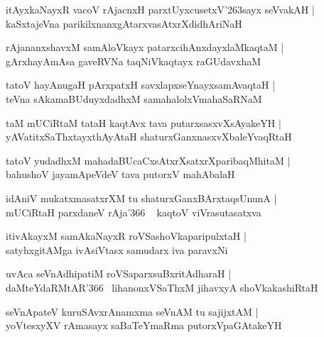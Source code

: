 \documentclass[twoside,12pt,openright]{book}
\def\S{\char'263}
\newcounter{shloka}[chapter]
\begin{document}
\begin{shloka}%
itAyxkaNayxR vacoV rAjacnxH parxtUyxcusetxV\S sayx seVvakAH |\\
kaSxtajeVna parikilxnanxgAtarxvasAtxrXdidhAriNaH 
\end{shloka}

\begin{shloka}%
rAjananxshavxM samAloVkayx patarxcihAnxdayxlaMkaqtaM |\\
gArxhayAmAsa gaveRVNa taqNiVkaqtayx raGUdavxhaM 
\end{shloka}

\begin{shloka}%
tatoV hayAnugaH pArxpatxH savxlapxseYnayxsamAvaqtaH |\\
teVna sAkamaBUduyxdadhxM samahalolxVmahaSaRNaM
\end{shloka}

\begin{shloka}%
taM mUCiRtaM tataH kaqtAvx tava putarxsasxvXsAyakeYH |\\
yAVatitxSaThxtayxthAyAtaH shaturxGanxnasxvXbaleYvaqRtaH
\end{shloka}

\begin{shloka}%
tatoV yudadhxM mahadaBUcaCxsAtxrXsatxrXparibaqMhitaM |\\
bahushoV jayamApeVdeV tava putorxV mahAbalaH 
\end{shloka}

\begin{shloka}%
idAniV mukatxmasatxrXM tu shaturxGanxBArxtaqsUnunA |\\
mUCiRtaH parxdaneV rAja\char'366 ~ kaqtoV viVrasutasatxva
\end{shloka}

\begin{shloka}%
itivAkayxM samAkaNayxR roVSashoVkaparipulxtaH |\\
satyhxgitAMga ivAsiVtasx samudarx iva paravxNi
\end{shloka}

\begin{shloka}%
uvAca seVnAdhipatiM roVSaparxsuBxritAdharaH |\\
daMteYdaRMtAR\char'366 ~lihanonxVSaThxM jihavxyA shoVkakashiRtaH
\end{shloka}

\begin{shloka}%
seVnApateV kuruSAvxrAnamxma seVnAM tu sajijxtAM |\\
yoVtesxyXV rAmasayx saBaTeYmaRma putorxVpaGAtakeYH 
\end{shloka}
\end{document}
